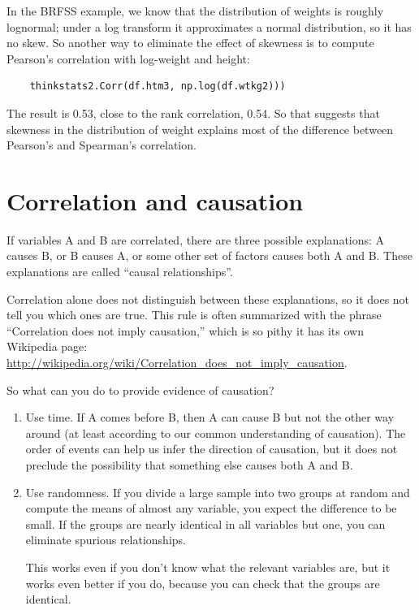 \documentclass[12pt]{book}
\begin{document}
In the BRFSS example, we know that the distribution of weights is
roughly lognormal; under a log transform it approximates a normal
distribution, so it has no skew.
So another way to eliminate the effect of skewness is to
compute Pearson's
correlation with log-weight and height:

\begin{verbatim}
    thinkstats2.Corr(df.htm3, np.log(df.wtkg2)))
\end{verbatim}

The result is 0.53, close to the rank correlation, 0.54.  So that
suggests that skewness in the distribution of weight explains most of
the difference between Pearson's and Spearman's correlation.


\section{Correlation and causation}

If variables A and B are correlated, there are three possible
explanations: A causes B, or B causes A, or some other set of factors
causes both A and B.  These explanations are called ``causal
relationships''.

Correlation alone does not distinguish between these explanations,
so it does not tell you which ones are true.
This rule is often summarized with the phrase ``Correlation
does not imply causation,'' which is so pithy it has its own
Wikipedia page: \url{http://wikipedia.org/wiki/Correlation_does_not_imply_causation}.

So what can you do to provide evidence of causation?

\begin{enumerate}

\item Use time.  If A comes before B, then A can cause B but not the
  other way around (at least according to our common understanding of
  causation).  The order of events can help us infer the direction
  of causation, but it does not preclude the possibility that something
  else causes both A and B.

\item Use randomness.  If you divide a large sample into two
  groups at random and compute the means of almost any variable, you
  expect the difference to be small.
  If the groups are nearly identical in all variables but one, you
  can eliminate spurious relationships.

  This works even if you don't know what the relevant variables
  are, but it works even better if you do, because you can check that
  the groups are identical.

\end{enumerate}
\end{document}

